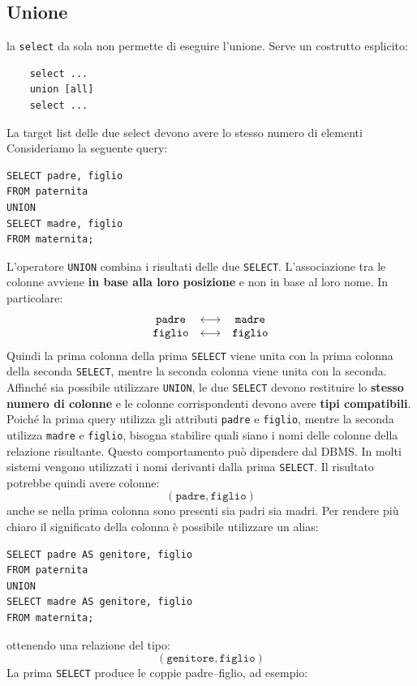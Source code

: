 \subsection{Unione}
la \texttt{select} da sola non permette di eseguire l'unione. Serve un costrutto esplicito:
\begin{verbatim}
    select ...
    union [all]
    select ...
\end{verbatim}
\noindent La target list delle due select devono avere lo stesso numero di elementi\\
Consideriamo la seguente query:
\begin{verbatim}
SELECT padre, figlio
FROM paternita
UNION
SELECT madre, figlio
FROM maternita;
\end{verbatim}
\noindent L'operatore \texttt{UNION} combina i risultati delle due \texttt{SELECT}.
L'associazione tra le colonne avviene \textbf{in base alla loro posizione}
e non in base al loro nome.
In particolare:
\[
\begin{array}{ccc}
\text{\texttt{padre}} & \longleftrightarrow & \text{\texttt{madre}} \\
\text{\texttt{figlio}} & \longleftrightarrow & \text{\texttt{figlio}}
\end{array}
\]
Quindi la prima colonna della prima \texttt{SELECT} viene unita con la
prima colonna della seconda \texttt{SELECT}, mentre la seconda colonna
viene unita con la seconda.
Affinché sia possibile utilizzare \texttt{UNION}, le due \texttt{SELECT}
devono restituire lo \textbf{stesso numero di colonne} e le colonne
corrispondenti devono avere \textbf{tipi compatibili}.
Poiché la prima query utilizza gli attributi \texttt{padre} e
\texttt{figlio}, mentre la seconda utilizza \texttt{madre} e
\texttt{figlio}, bisogna stabilire quali siano i nomi delle colonne
della relazione risultante.
Questo comportamento può dipendere dal DBMS. In molti sistemi vengono
utilizzati i nomi derivanti dalla prima \texttt{SELECT}. Il risultato
potrebbe quindi avere colonne:
\[
(\texttt{padre},\texttt{figlio})
\]
anche se nella prima colonna sono presenti sia padri sia madri.
Per rendere più chiaro il significato della colonna è possibile utilizzare
un alias:
\begin{verbatim}
SELECT padre AS genitore, figlio
FROM paternita
UNION
SELECT madre AS genitore, figlio
FROM maternita;
\end{verbatim}
\noindent ottenendo una relazione del tipo:
\[
(\texttt{genitore},\texttt{figlio})
\]
La prima \texttt{SELECT} produce le coppie padre--figlio, ad \textcolor{verdeEsempio}{esempio:}
